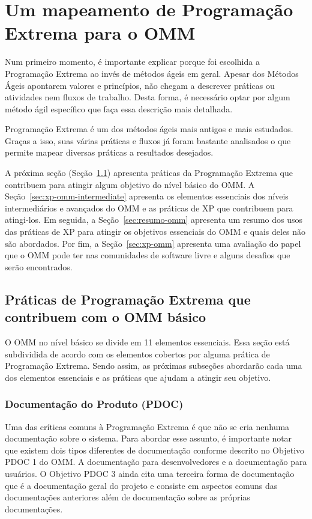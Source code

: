 \section{Um mapeamento de Programação Extrema para o OMM}
\label{sec:xp-em-omm}

Num primeiro momento, é importante explicar porque foi escolhida a
Programação Extrema ao invés de métodos ágeis em geral. Apesar dos
Métodos Ágeis apontarem valores e princípios, não chegam a descrever
práticas ou atividades nem fluxos de trabalho. Desta forma, é
necessário optar por algum método ágil específico que faça essa
descrição mais detalhada.

Programação Extrema é um dos métodos ágeis mais antigos e mais
estudados. Graças a isso, suas várias práticas e fluxos já foram
bastante analisados o que permite mapear diversas práticas a
resultados desejados.

A próxima seção (Seção~\ref{sec:xp+omm}) apresenta práticas da
Programação Extrema que contribuem para atingir algum objetivo do
nível básico do OMM. A Seção~\ref{sec:xp-omm-intermediate} apresenta
os elementos essenciais dos níveis intermediários e avançados do OMM e
as práticas de XP que contribuem para atingi-los.  Em seguida, a
Seção~\ref{sec:resumo-omm} apresenta um resumo dos usos das práticas
de XP para atingir os objetivos essenciais do OMM e quais deles não
são abordados. Por fim, a Seção~\ref{sec:xp-omm} apresenta uma
avaliação do papel que o OMM pode ter nas comunidades de software
livre e alguns desafios que serão encontrados.

\subsection{Práticas de Programação Extrema que contribuem com o OMM
  básico}
\label{sec:xp+omm}

O OMM no nível básico se divide em 11 elementos essenciais. Essa seção
está subdividida de acordo com os elementos cobertos por alguma
prática de Programação Extrema. Sendo assim, as próximas subseções
abordarão cada uma dos elementos essenciais e as práticas que ajudam a
atingir seu objetivo.

\subsubsection{Documentação do Produto (PDOC)}
\label{sec:+pdoc}

Uma das críticas comuns à Programação Extrema é que não se cria
nenhuma documentação sobre o sistema. Para abordar esse assunto, é
importante notar que existem dois tipos diferentes de documentação
conforme descrito no Objetivo PDOC 1 do OMM. A documentação para
desenvolvedores e a documentação para usuários. O Objetivo PDOC 3
ainda cita uma terceira forma de documentação que é a documentação
geral do projeto e consiste em aspectos comuns das documentações
anteriores além de documentação sobre as próprias documentações.

